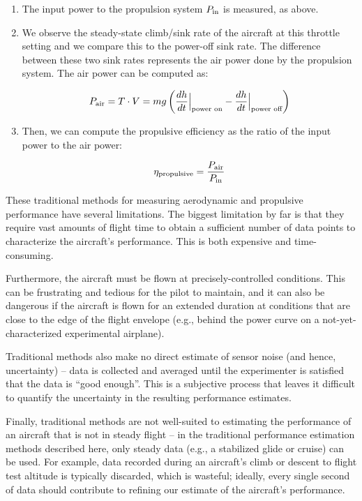 \documentclass[conf]{new-aiaa}
\begin{document}
    \begin{enumerate}
        \item The input power to the propulsion system $P_{\rm in}$ is measured, as above.
        \item We observe the steady-state climb/sink rate of the aircraft at this throttle setting and we compare this to the power-off sink rate. The difference between these two sink rates represents the air power done by the propulsion system. The air power can be computed as:

        $$P_{\rm air}=T \cdot V = m g \left( \frac{dh}{dt}\Big |_\text{power on} - \frac{dh}{dt}\Big |_\text{power off} \right)$$

        \item Then, we can compute the propulsive efficiency as the ratio of the input power to the air power:

        $$\eta_{\rm propulsive} = \frac{P_{\rm air}}{P_{\rm in}}$$

    \end{enumerate}

    These traditional methods for measuring aerodynamic and propulsive performance have several limitations. The biggest limitation by far is that they require vast amounts of flight time to obtain a sufficient number of data points to characterize the aircraft's performance. This is both expensive and time-consuming.

    Furthermore, the aircraft must be flown at precisely-controlled conditions. This can be frustrating and tedious for the pilot to maintain, and it can also be dangerous if the aircraft is flown for an extended duration at conditions that are close to the edge of the flight envelope (e.g., behind the power curve on a not-yet-characterized experimental airplane).

    Traditional methods also make no direct estimate of sensor noise (and hence, uncertainty) -- data is collected and averaged until the experimenter is satisfied that the data is ``good enough''. This is a subjective process that leaves it difficult to quantify the uncertainty in the resulting performance estimates.

    Finally, traditional methods are not well-suited to estimating the performance of an aircraft that is not in steady flight -- in the traditional performance estimation methods described here, only steady data (e.g., a stabilized glide or cruise) can be used. For example, data recorded during an aircraft's climb or descent to flight test altitude is typically discarded, which is wasteful; ideally, every single second of data should contribute to refining our estimate of the aircraft's performance.
\end{document}
